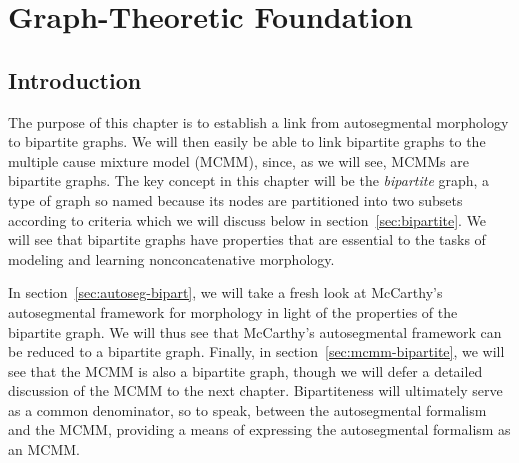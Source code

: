 \chapter{Graph-Theoretic Foundation}
\label{ch:graph}
\section{Introduction}
The purpose of this chapter is to
establish a link from autosegmental morphology to bipartite graphs. We will then easily be
able to link bipartite graphs to the multiple cause mixture model (MCMM), since, as we will see,
MCMMs are bipartite graphs.
The key concept in this chapter will be the \emph{bipartite} graph, 
a type of graph so named because its nodes are partitioned into two subsets according 
to criteria which we will discuss below in section~\ref{sec:bipartite}. 
We will see that bipartite graphs have properties that are essential 
to the tasks of modeling and learning nonconcatenative morphology.

In section~\ref{sec:autoseg-bipart}, we will take a fresh look at McCarthy's 
autosegmental framework for morphology \citep{mccarthy:1981} in light of the 
properties of the bipartite graph. We will thus see that 
McCarthy's 
autosegmental framework can be reduced to a bipartite graph.
Finally, in section~\ref{sec:mcmm-bipartite}, we will see that the MCMM is also a bipartite graph,
though we will defer a detailed discussion of the MCMM to the next chapter.
Bipartiteness will ultimately serve as a common denominator, so to speak, between the autosegmental formalism and the MCMM, providing a means of expressing the autosegmental formalism as an MCMM.
 
